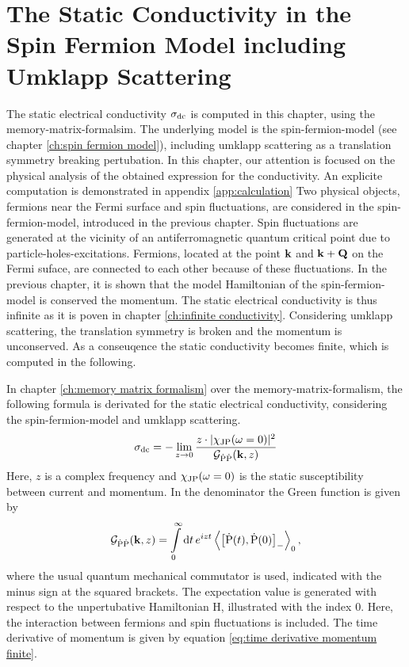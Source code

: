 %
%
%
\chapter{The Static Conductivity in the Spin Fermion Model including Umklapp Scattering}
\label{ch:calculation}
%
%
%
The static electrical conductivity $\sigma_{\mathrm{dc}}$ is computed in this chapter, using the memory-matrix-formalsim.
The underlying model is the spin-fermion-model (see chapter \ref{ch:spin fermion model}), including umklapp scattering as a translation symmetry breaking pertubation.
In this chapter, our attention is focused on the physical analysis of the obtained expression for the conductivity.
An explicite computation is demonstrated in appendix \ref{app:calculation}
%
%
%
%
Two physical objects, fermions near the Fermi surface and spin fluctuations, are considered in the spin-fermion-model, introduced in the previous chapter.
Spin fluctuations are generated at the vicinity of an antiferromagnetic quantum critical point due to particle-holes-excitations.
Fermions, located at the point $\vb{k}$ and $\vb{k}+\vb{Q}$ on the Fermi suface, are connected to each other because of these fluctuations.
In the previous chapter, it is shown that the model Hamiltonian of the spin-fermion-model is conserved the momentum.
The static electrical conductivity is thus infinite as it is poven in chapter \ref{ch:infinite conductivity}.
Considering umklapp scattering, the translation symmetry is broken and the momentum is unconserved.
As a conseuqence the static conductivity becomes finite, which is computed in the following.

In chapter \ref{ch:memory matrix formalism} over the memory-matrix-formalism, the following formula is derivated for the static electrical conductivity, considering the spin-fermion-model and umklapp scattering.
%
\begin{align}
	\sigma_{\mathrm{dc}} = -\lim\limits_{z \to 0} \frac{z \cdot |\chi_{\mathrm{JP}}(\omega = 0)|^{2}}{\mathcal{G}_{\dot{\mathrm{P}}\dot{\mathrm{P}}}(\vb{k}, z)}
	\label{eq:static conductivity formula}
\end{align}
%
Here, $z$ is a complex frequency and $\chi_{\mathrm{JP}}(\omega = 0)$ is the static susceptibility between current and momentum.
In the denominator the Green function is given by
%
\begin{align}
	\mathcal{G}_{\dot{\mt{P}}\dot{\mt{P}}}(\vb{k}, z) = \int\limits_{0}^{\infty} \dd{t} e^{izt} \expval{\comm{\dot{\mt{P}}(t)}{\dot{\mt{P}}(0)}_{-}}_{0},
	\label{eq:Green function}
\end{align}
%
where the usual quantum mechanical commutator is used, indicated with the minus sign at the squared brackets.
The expectation value is generated with respect to the unpertubative Hamiltonian H, illustrated with the index 0.
Here, the interaction between fermions and spin fluctuations is included.
The time derivative of momentum is given by equation \eqref{eq:time derivative momentum finite}.

